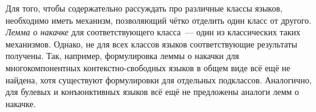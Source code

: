 Для того, чтобы содержательно рассуждать про различные классы языков, необходимо иметь механизм, позволяющий чётко отделить один класс от другого.
\emph{Лемма о накачке} для соответствующего класса~--- один из классических таких механизмов.
Однако, не для всех классов языков соответствующие результаты получены.
Так, например, формулировка леммы о накачки для многокомпонентных контекстно-свободных языков в общем виде всё ещё не найдена, хотя существуют формулировки для отдельных подклассов.
Аналогично, для булевых и конъюнктивных языков всё ещё не предложены аналоги лемм о накачке.


